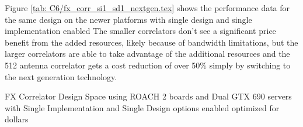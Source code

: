 Figure \ref{tab: C6/fx_corr_si1_sd1_nextgen.tex} shows the performance data for the same design on the newer platforms with single design and single implementation enabled
The smaller correlators don't see a significant price benefit from the added resources, likely because of bandwidth limitations, but the larger correlators are able to take advantage of the additional resources and the 512 antenna correlator gets a cost reduction of over 50\% simply by switching to the next generation technology.

\begin{table}

\caption{FX Correlator Design Space using ROACH 2 boards and Dual GTX 690 servers  with Single Implementation and Single Design options enabled optimized for dollars}
\label{tab: C6/fx_corr_si1_sd1_nextgen.tex}
\end{table} 

